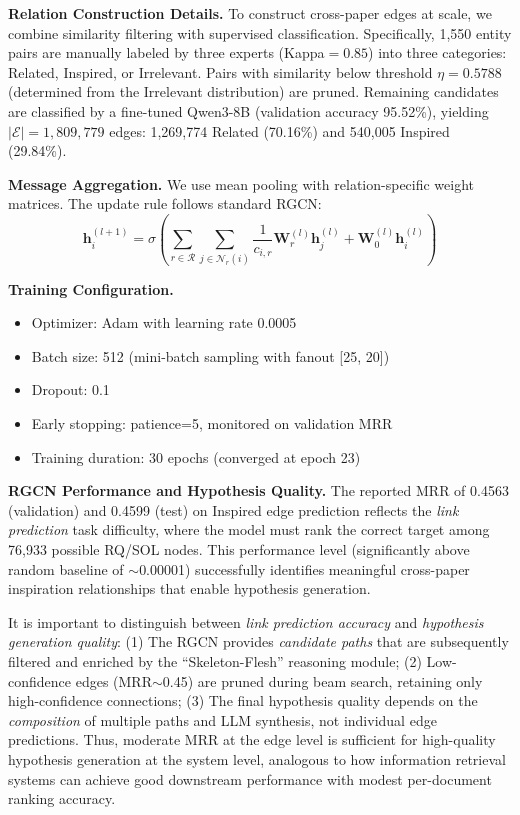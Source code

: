 \documentclass[runningheads]{llncs}
\begin{document}
\textbf{Relation Construction Details.} To construct cross-paper edges at scale, we combine similarity filtering with supervised classification. Specifically, 1,550 entity pairs are manually labeled by three experts (Kappa$=0.85$) into three categories: Related, Inspired, or Irrelevant. Pairs with similarity below threshold $\eta = 0.5788$ (determined from the Irrelevant distribution) are pruned. Remaining candidates are classified by a fine-tuned Qwen3-8B (validation accuracy 95.52\%), yielding $|\mathcal{E}| = 1{,}809{,}779$ edges: 1,269,774 Related (70.16\%) and 540,005 Inspired (29.84\%).


\textbf{Message Aggregation.} We use mean pooling with relation-specific weight matrices. The update rule follows standard RGCN:
\begin{equation}
\mathbf{h}_i^{(l+1)} = \sigma\left(\sum_{r\in\mathcal{R}}\sum_{j\in\mathcal{N}_r(i)}\frac{1}{c_{i,r}}\mathbf{W}_r^{(l)}\mathbf{h}_j^{(l)} + \mathbf{W}_0^{(l)}\mathbf{h}_i^{(l)}\right)
\end{equation}

\textbf{Training Configuration.} 
\begin{itemize}[leftmargin=*]
    \item Optimizer: Adam with learning rate 0.0005
    \item Batch size: 512 (mini-batch sampling with fanout [25, 20])
    \item Dropout: 0.1
    \item Early stopping: patience=5, monitored on validation MRR
    \item Training duration: 30 epochs (converged at epoch 23)
\end{itemize}

\textbf{RGCN Performance and Hypothesis Quality.} The reported MRR of 0.4563 (validation) and 0.4599 (test) on Inspired edge prediction reflects the \textit{link prediction} task difficulty, where the model must rank the correct target among 76,933 possible RQ/SOL nodes. This performance level (significantly above random baseline of $\sim$0.00001) successfully identifies meaningful cross-paper inspiration relationships that enable hypothesis generation.

It is important to distinguish between \textit{link prediction accuracy} and \textit{hypothesis generation quality}: (1) The RGCN provides \textit{candidate paths} that are subsequently filtered and enriched by the ``Skeleton-Flesh'' reasoning module; (2) Low-confidence edges (MRR$\sim$0.45) are pruned during beam search, retaining only high-confidence connections; (3) The final hypothesis quality depends on the \textit{composition} of multiple paths and LLM synthesis, not individual edge predictions. Thus, moderate MRR at the edge level is sufficient for high-quality hypothesis generation at the system level, analogous to how information retrieval systems can achieve good downstream performance with modest per-document ranking accuracy.
\end{document}

